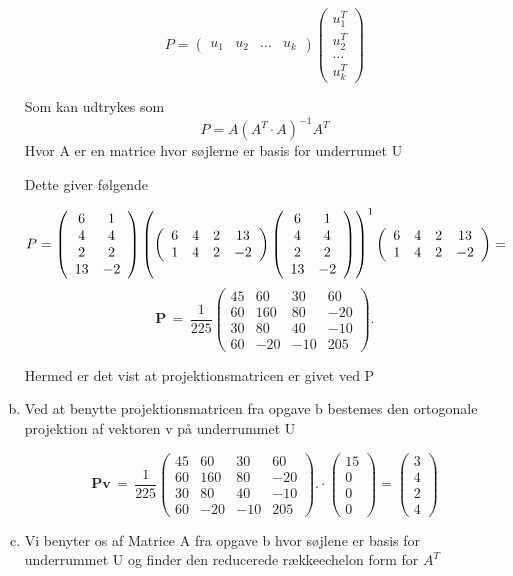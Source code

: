 \documentclass[12pt]{article}
\begin{document}
\begin{enumerate}[(a)]
$$
P= \left(\begin{array}{cccc}
u_1&
u_2&
\ldots&
u_k
\end{array}\right)
\left(\begin{array}{c}
u^T_1\\
u^T_2\\
\ldots\\
u^T_k
\end{array}\right)  
$$

Som kan udtrykes som
$$
P=A(A^T \cdot A)^{-1} A^T
$$
Hvor A er en matrice hvor søjlerne er basis for underrumet U

Dette giver følgende

$$
P= \left(\begin{array}{cc} 6&1\\ 4&4\\ 2&2\\ 13&-2 \end{array}\right) \left(\left(\begin{array}{cccc} 6&4&2&13\\ 1&4&2&-2 \end{array}\right) \left(\begin{array}{cc} 6&1\\ 4&4\\ 2&2\\ 13&-2 \end{array}\right)\right) ^1 \left(\begin{array}{cccc} 6&4&2&13\\ 1&4&2&-2 \end{array}\right) =
$$
$$
  \mathbf{P} \,=\, 
    \frac{1}{225}
    \left(\!\!
    \begin{array}{rrrr}
       45 &  60 &  30 &  60 \\
       60 & 160 &  80 & -20 \\
       30 &  80 &  40 & -10 \\
       60 & -20 & -10 & 205 
    \end{array}
    \!\!\right).
$$

Hermed er det vist at projektionsmatricen er givet ved P

\item
Ved at benytte projektionsmatricen fra opgave b bestemes den ortogonale
projektion af vektoren v på underrummet U 

$$
  \mathbf{Pv} \,=\, 
    \frac{1}{225}
    \left(\!\!
    \begin{array}{rrrr}
       45 &  60 &  30 &  60 \\
       60 & 160 &  80 & -20 \\
       30 &  80 &  40 & -10 \\
       60 & -20 & -10 & 205 
    \end{array}
    \!\!\right).
\cdot
\left(\begin{array}{c}
15\\0\\0\\0
\end{array}\right)=
\left(\begin{array}{c}
3\\4\\2\\4
\end{array}\right)
$$
\item
Vi benyter os af Matrice A fra opgave b hvor søjlene er basis for underrummet U
og finder den reducerede rækkeechelon form for $A^T$


\end{enumerate}
\end{document}
